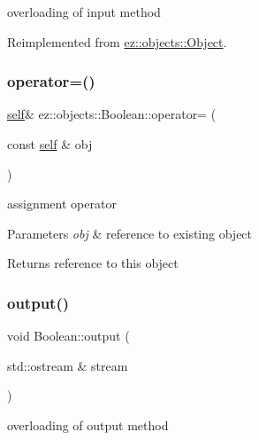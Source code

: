 overloading of input method 

Reimplemented from \hyperlink{classez_1_1objects_1_1Object_a878bdc53b7f16fda6fa15dab214c4b6a}{ez\+::objects\+::\+Object}.

\mbox{\label{classez_1_1objects_1_1Boolean_a4c112c8a5f7e35bd4de19f0b52fa74c7}} 
\subsubsection{\texorpdfstring{operator=()}{operator=()}}
{\footnotesize\ttfamily \hyperlink{classez_1_1objects_1_1Boolean}{self}\& ez\+::objects\+::\+Boolean\+::operator= (\begin{DoxyParamCaption}\item[{const \hyperlink{classez_1_1objects_1_1Boolean}{self} \&}]{obj }\end{DoxyParamCaption})\hspace{0.3cm}{\ttfamily [inline]}}

assignment operator 
\begin{DoxyParams}{Parameters}
{\em obj} & reference to existing object \\
\hline
\end{DoxyParams}
\begin{DoxyReturn}{Returns}
reference to this object 
\end{DoxyReturn}
\mbox{\label{classez_1_1objects_1_1Boolean_a313c385e8ce93e19fd774882143f3a25}} 
\subsubsection{\texorpdfstring{output()}{output()}}
{\footnotesize\ttfamily void Boolean\+::output (\begin{DoxyParamCaption}\item[{std\+::ostream \&}]{stream }\end{DoxyParamCaption})\hspace{0.3cm}{\ttfamily [virtual]}}

overloading of output method 

